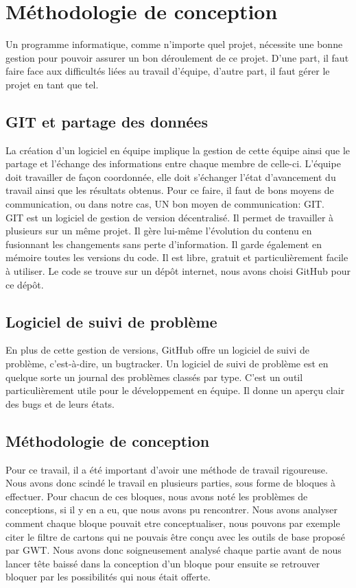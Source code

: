 \chapter{Méthodologie de conception}
Un programme informatique, comme n'importe quel projet, nécessite une bonne gestion pour pouvoir assurer un bon déroulement de ce projet.
D'une part, il faut faire face aux difficultés liées au travail d'équipe, d'autre part, il faut gérer le projet en tant que tel.

  \section{GIT et partage des données}
  La création d'un logiciel en équipe implique la gestion de cette équipe ainsi que le partage et l'échange des
  informations entre chaque membre de celle-ci.
  L'équipe doit travailler de façon coordonnée, elle doit s'échanger l'état
  d'avancement du travail ainsi que les résultats obtenus. Pour ce faire, il faut
  de bons moyens de communication, ou dans notre cas, UN bon moyen de communication: GIT\cite{git}. \\

  GIT est un logiciel de gestion de version décentralisé. Il permet de
  travailler à plusieurs sur un même projet. Il gère lui-même l'évolution du
  contenu en fusionnant les changements sans perte d'information. Il garde
  également en mémoire toutes les versions du code. Il est libre, gratuit et
  particulièrement facile à utiliser. Le code se trouve sur un dépôt internet, nous avons choisi GitHub\cite{github} pour ce dépôt.\\

  \section{Logiciel de suivi de problème}
  En plus de cette gestion de versions, GitHub offre un logiciel de suivi de problème, c'est-à-dire, un bugtracker.
  Un logiciel de suivi de problème est en quelque sorte un journal des problèmes classés par type.
  C'est un outil particulièrement utile pour le développement en équipe. Il donne un aperçu clair des bugs et de leurs états.

  \section{Méthodologie de conception}
Pour ce travail, il a été important d'avoir une méthode de travail rigoureuse. Nous avons donc scindé le travail en plusieurs parties, sous forme de bloques à effectuer. Pour chacun de ces bloques, nous avons noté les problèmes de conceptions, si il y en a eu, que nous avons pu rencontrer. Nous avons analyser comment chaque bloque pouvait etre conceptualiser, nous pouvons par exemple citer le filtre de cartons qui ne pouvais être conçu avec les outils de base proposé par GWT. Nous avons donc soigneusement analysé chaque partie avant de nous lancer tête baissé dans la conception d'un bloque pour ensuite se retrouver bloquer par les possibilités qui nous était offerte.

